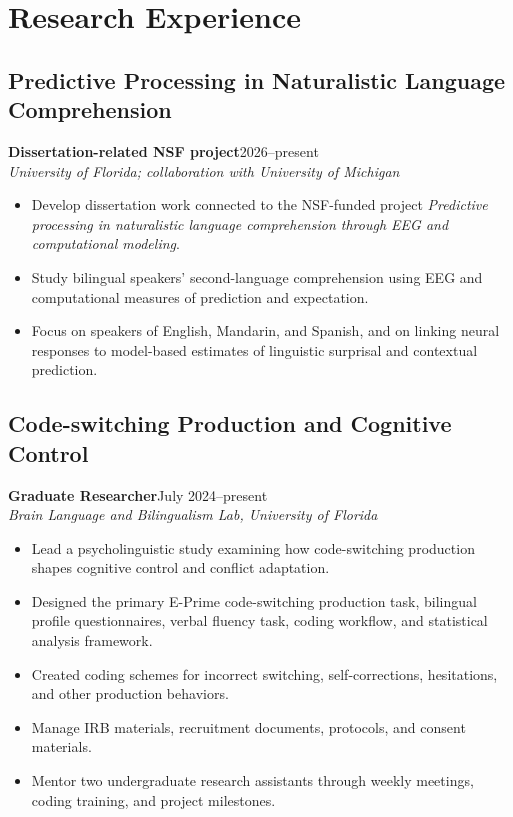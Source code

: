 \documentclass[11pt,letterpaper]{article}
\newcommand{\role}[3]{\textbf{#1}\hfill #2\\\textit{#3}\\}
\begin{document}
\section*{Research Experience}
\subsection*{Predictive Processing in Naturalistic Language Comprehension}
\role{Dissertation-related NSF project}{2026--present}{University of Florida; collaboration with University of Michigan}
\begin{itemize}
\item Develop dissertation work connected to the NSF-funded project \textit{Predictive processing in naturalistic language comprehension through EEG and computational modeling}.
\item Study bilingual speakers' second-language comprehension using EEG and computational measures of prediction and expectation.
\item Focus on speakers of English, Mandarin, and Spanish, and on linking neural responses to model-based estimates of linguistic surprisal and contextual prediction.
\end{itemize}

\subsection*{Code-switching Production and Cognitive Control}
\role{Graduate Researcher}{July 2024--present}{Brain Language and Bilingualism Lab, University of Florida}
\begin{itemize}
\item Lead a psycholinguistic study examining how code-switching production shapes cognitive control and conflict adaptation.
\item Designed the primary E-Prime code-switching production task, bilingual profile questionnaires, verbal fluency task, coding workflow, and statistical analysis framework.
\item Created coding schemes for incorrect switching, self-corrections, hesitations, and other production behaviors.
\item Manage IRB materials, recruitment documents, protocols, and consent materials.
\item Mentor two undergraduate research assistants through weekly meetings, coding training, and project milestones.
\end{itemize}
\end{document}
